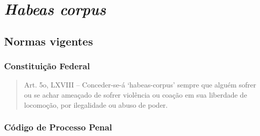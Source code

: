 \documentclass{article}
\begin{document}
\section{\textit{Habeas corpus}}

\subsection{Normas vigentes}

\subsubsection{Constituição Federal}

\begin{quote}
    Art. 5o, LXVIII – Conceder-se-á ‘habeas-corpus’ sempre que alguém sofrer ou se achar ameaçado de sofrer violência ou coação em sua liberdade de locomoção, por ilegalidade ou abuso de poder.
\end{quote}

\subsubsection{Código de Processo Penal}
\end{document}
